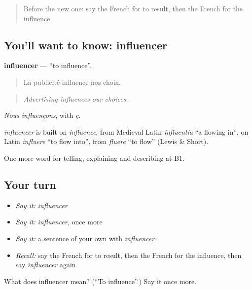 \begin{quote}
Before the new one: say the French for to result, then the French for the influence.
\end{quote}

\subsection*{You'll want to know: influencer}
\textbf{influencer} — \textquotedblleft{}to influence\textquotedblright{}.

\begin{quote}
La publicité influence nos choix.
\end{quote}

\begin{quote}
\emph{Advertising influences our choices.}
\end{quote}

\emph{Nous influençons}, with \emph{ç}.

\begin{cousinweb}
\emph{influencer} is built on \emph{influence}, from Medieval Latin \emph{influentia} \textquotedblleft{}a flowing in\textquotedblright{}, on Latin \emph{influere} \textquotedblleft{}to flow into\textquotedblright{}, from \emph{fluere} \textquotedblleft{}to flow\textquotedblright{} (Lewis \& Short).
\end{cousinweb}

\begin{grammarlens}[title={What you've built}]
One more word for telling, explaining and describing at B1.
\end{grammarlens}

\subsection*{Your turn}
\begin{itemize}
\raggedright
  \item \emph{Say it:} \emph{influencer}
  \item \emph{Say it:} \emph{influencer}, once more
  \item \emph{Say it:} a sentence of your own with \emph{influencer}
  \item \emph{Recall:} say the French for to result, then the French for the influence, then say \emph{influencer} again
\end{itemize}

\begin{tcolorbox}[breakable,colback=teal!4,colframe=teal!35!black,title={Before you move on}]
What does influencer mean? (\textquotedblleft{}To influence\textquotedblright{}.) Say it once more.
\end{tcolorbox}
